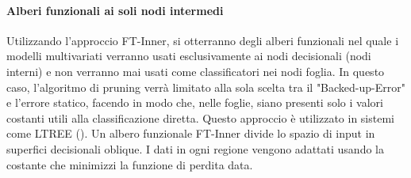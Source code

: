 \paragraph{Alberi funzionali ai soli nodi intermedi}
\label{Alberi funzionali ai soli nodi intermedi}
Utilizzando l'approccio FT-Inner, si otterranno degli alberi funzionali nel quale i modelli multivariati verranno usati esclusivamente ai nodi decisionali (nodi interni) e non verranno mai usati come classificatori nei nodi foglia. In questo caso, l'algoritmo di pruning verrà limitato alla sola scelta tra il "Backed-up-Error" e l'errore statico, facendo in modo che, nelle foglie, siano presenti solo i valori costanti utili alla classificazione diretta. Questo approccio è utilizzato in sistemi come LTREE (\cite{conf/icml/Gama97}). Un albero funzionale FT-Inner divide lo spazio di input in superfici decisionali oblique. I dati in ogni regione vengono adattati usando la costante che minimizzi la funzione di perdita data.

